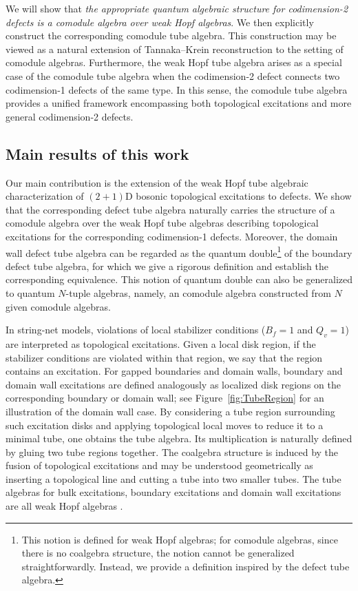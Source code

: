 \documentclass[a4paper,11pt]{article}
\theoremstyle{definition}
\theoremstyle{remark}
\begin{document}
We will show that \emph{the appropriate quantum algebraic structure for codimension-2 defects is a comodule algebra over weak Hopf algebras}. We then explicitly construct the corresponding comodule tube algebra. This construction may be viewed as a natural extension of Tannaka--Krein reconstruction to the setting of comodule algebras. Furthermore, the weak Hopf tube algebra arises as a special case of the comodule tube algebra when the codimension-2 defect connects two codimension-1 defects of the same type. In this sense, the comodule tube algebra provides a unified framework encompassing both topological excitations and more general codimension-2 defects.



\subsection{Main results of this work}

Our main contribution is the extension of the weak Hopf tube algebraic characterization of $(2+1)$D bosonic topological excitations to defects. We show that the corresponding defect tube algebra naturally carries the structure of a comodule algebra over the weak Hopf tube algebras describing topological excitations for the corresponding codimension-1 defects. Moreover, the domain wall defect tube algebra can be regarded as the quantum double\footnote{This notion is defined for weak Hopf algebras; for comodule algebras, since there is no coalgebra structure, the notion cannot be generalized straightforwardly. Instead, we provide a definition inspired by the defect tube algebra.} of the boundary defect tube algebra, for which we give a rigorous definition and establish the corresponding equivalence. This notion of quantum double can also be generalized to quantum $N$-tuple algebras, namely, an comodule algebra constructed from $N$ given comodule algebras.


In string-net models, violations of local stabilizer conditions ($B_f=1$ and $Q_v=1$) are interpreted as topological excitations. Given a local disk region, if the stabilizer conditions are violated within that region, we say that the region contains an excitation. For gapped boundaries and domain walls, boundary and domain wall excitations are defined analogously as localized disk regions on the corresponding boundary or domain wall; see Figure~\ref{fig:TubeRegion} for an illustration of the domain wall case. By considering a tube region surrounding such excitation disks and applying topological local moves to reduce it to a minimal tube, one obtains the tube algebra. Its multiplication is naturally defined by gluing two tube regions together. The coalgebra structure is induced by the fusion of topological excitations and may be understood geometrically as inserting a topological line and cutting a tube into two smaller tubes. The tube algebras for bulk excitations, boundary excitations and domain wall excitations are all weak Hopf algebras \cite{Kitaev2012boundary,bridgeman2023invertible,jia2024weakTube,jia2025tube,bai2025weakhopf}.
\end{document}
